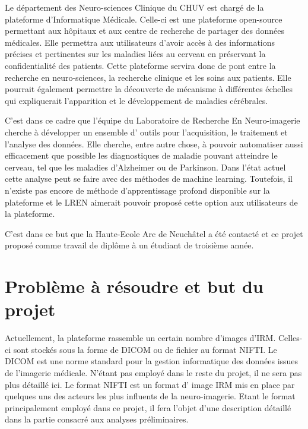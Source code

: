 \documentclass[a4paper,10pt,openany,oneside]{sphinxmanual}
\begin{document}
Le département des Neuro-sciences Clinique du CHUV est chargé de la plateforme d'Informatique Médicale. Celle-ci
est une plateforme open-source permettant aux hôpitaux et aux centre de recherche de partager des données médicales.
Elle permettra aux utilisateurs d'avoir accès à des informations précises et pertinentes sur les maladies liées au
cerveau en préservant la confidentialité des patients. Cette plateforme servira donc de pont entre la recherche en
neuro-sciences, la recherche clinique et les soins aux patients. Elle pourrait également permettre la découverte de
mécanisme à différentes échelles qui expliquerait l'apparition et le développement de maladies cérébrales.

C'est dans ce cadre que l'équipe du Laboratoire de Recherche En Neuro-imagerie cherche à développer un ensemble d'
outils pour l'acquisition, le traitement et l'analyse des données. Elle cherche, entre autre chose, à pouvoir automatiser
aussi efficacement que possible les diagnostiques de maladie pouvant atteindre le cerveau, tel que les maladies
d'Alzheimer ou de Parkinson. Dans l'état actuel cette analyse peut se faire avec des méthodes de machine learning.
Toutefois, il n'existe pas encore de méthode d'apprentissage profond disponible sur la plateforme et le LREN aimerait
pouvoir proposé cette option aux utilisateurs de la plateforme.

C'est dans ce but que la Haute-Ecole Arc de Neuchâtel a été contacté et ce projet proposé comme travail de diplôme à
un étudiant de troisième année.


\section{Problème à résoudre et but du projet}
\label{index:probleme-a-resoudre-et-but-du-projet}
Actuellement, la plateforme rassemble un certain nombre d'images d'IRM. Celles-ci sont stockés sous la forme de DICOM ou
de fichier au format NIFTI. Le DICOM est une norme standard pour la gestion informatique des données issues de l'imagerie
médicale. N'étant pas employé dans le reste du projet, il ne sera pas plus détaillé ici. Le format NIFTI est un format d'
image IRM mis en place par quelques uns des acteurs les plus influents de la neuro-imagerie. Etant le format principalement
employé dans ce projet, il fera l'objet d'une description détaillé dans la partie consacré aux analyses préliminaires.
\end{document}
